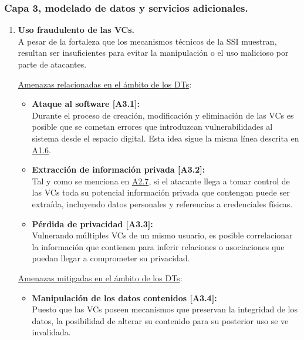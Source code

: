 \documentclass[../main.tex]{subfiles}
\begin{document}
\subsubsection{Capa 3, modelado de datos y servicios adicionales.}
\begin{enumerate}[label=\textbf{R3.\arabic*}, leftmargin=48pt]
    \item \textbf{Uso fraudulento de las \acrshort{VC}s.}\label{R3.1}
    \\ A pesar de la fortaleza que los mecanismos técnicos de la \acrshort{SSI} muestran, resultan  ser insuficientes para evitar la manipulación o el uso malicioso por parte de atacantes.

    \underline{Amenazas relacionadas en el ámbito de los \acrshort{DT}s}:
    \begin{itemize}
        \item \textbf{Ataque al software [A3.1]:}\label{A3.1}
        \\ Durante el proceso de creación, modificación y eliminación de las \acrshort{VC}s es posible que se cometan errores que introduzcan vulnerabilidades al sistema desde el espacio digital. Esta idea sigue la misma línea descrita en \hyperref[A1.6]{A1.6}.
        \item \textbf{Extracción de información privada [A3.2]:}\label{A3.2}
        \\ Tal y como se menciona en \hyperref[A2.7]{A2.7}, si el atacante llega a tomar control de las \acrshort{VC}s toda su potencial información privada que contengan puede ser extraída, incluyendo datos personales y referencias a credenciales físicas.
        \item \textbf{Pérdida de privacidad [A3.3]:}\label{A3.3}
        \\ Vulnerando múltiples \acrshort{VC}s de un mismo usuario, es posible correlacionar la información que contienen para inferir relaciones o asociaciones que puedan llegar a comprometer su privacidad.
    \end{itemize}
    
    \underline{Amenazas mitigadas en el ámbito de los \acrshort{DT}s}: 
    \begin{itemize}
        \item \textbf{Manipulación de los datos contenidos [A3.4]:}\label{A3.4}
        \\ Puesto que las \acrshort{VC}s poseen mecanismos que preservan la integridad de los datos, la posibilidad de alterar su contenido para su posterior uso se ve invalidada. 
        \\
    \end{itemize}
\end{enumerate}
\end{document}
